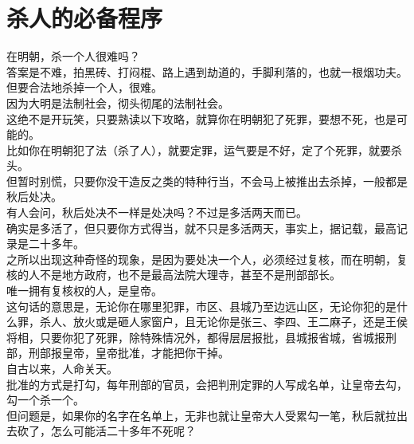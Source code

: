 \section{杀人的必备程序}
\ifnum{}
	\begin{multicols}{\theparacolNo}
\fi
在明朝，杀一个人很难吗？\\

答案是不难，拍黑砖、打闷棍、路上遇到劫道的，手脚利落的，也就一根烟功夫。\\

但要合法地杀掉一个人，很难。\\

因为大明是法制社会，彻头彻尾的法制社会。\\

这绝不是开玩笑，只要熟读以下攻略，就算你在明朝犯了死罪，要想不死，也是可能的。\\

比如你在明朝犯了法（杀了人），就要定罪，运气要是不好，定了个死罪，就要杀头。\\

但暂时别慌，只要你没干造反之类的特种行当，不会马上被推出去杀掉，一般都是秋后处决。\\

有人会问，秋后处决不一样是处决吗？不过是多活两天而已。\\

确实是多活了，但只要你方式得当，就不只是多活两天，事实上，据记载，最高记录是二十多年。\\

之所以出现这种奇怪的现象，是因为要处决一个人，必须经过复核，而在明朝，复核的人不是地方政府，也不是最高法院大理寺，甚至不是刑部部长。\\

唯一拥有复核权的人，是皇帝。\\

这句话的意思是，无论你在哪里犯罪，市区、县城乃至边远山区，无论你犯的是什么罪，杀人、放火或是砸人家窗户，且无论你是张三、李四、王二麻子，还是王侯将相，只要你犯了死罪，除特殊情况外，都得层层报批，县城报省城，省城报刑部，刑部报皇帝，皇帝批准，才能把你干掉。\\

自古以来，人命关天。\\

批准的方式是打勾，每年刑部的官员，会把判刑定罪的人写成名单，让皇帝去勾，勾一个杀一个。\\

但问题是，如果你的名字在名单上，无非也就让皇帝大人受累勾一笔，秋后就拉出去砍了，怎么可能活二十多年不死呢？\\


\end{multicols}
